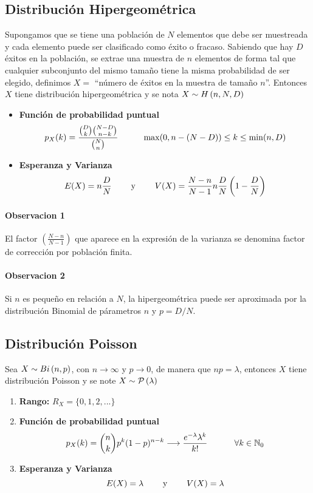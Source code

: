 \subsection{Distribución Hipergeométrica}
Supongamos que se tiene una población de $N$ elementos que debe ser muestreada y cada elemento puede ser clasificado como éxito o fracaso. Sabiendo que hay $D$ éxitos en la población, se extrae una muestra de $n$ elementos de forma tal que cualquier subconjunto del mismo tamaño tiene la misma probabilidad de ser elegido, definimos $X=$ ``número de éxitos en la muestra de tamaño $n$''. Entonces $X$ tiene distribución hipergeométrica y se nota $X\sim H\left(n,N,D\right)$

\begin{itemize}
\item \textbf{Función de probabilidad puntual}
\begin{align*}
p_X(k) = \frac{\binom{D}{k}\binom{N-D}{n-k}}{\binom{N}{n}} \hspace*{1cm} \max(0,n-(N-D))\leq k \leq \min(n,D)
\end{align*}
\item \textbf{Esperanza y Varianza}
$$E(X) = n\frac{D}{N}  \hspace*{8mm}\text{y}\hspace*{8mm} V(X) = \frac{N-n}{N-1}n\frac{D}{N}\left(1-\frac{D}{N}\right)$$
\end{itemize}

\paragraph{Observacion 1} El factor $\left(\frac{N-n}{N-1}\right)$ que aparece en la expresión de la varianza se denomina factor de corrección por población finita.
\paragraph{Observacion 2} Si $n$ es pequeño en relación a $N$, la hipergeométrica puede ser aproximada por la distribución Binomial de párametros $n$ y $p=D/N$.

\subsection{Distribución Poisson}
Sea $X\sim Bi\left(n,p\right)$, con $n \rightarrow \infty$ y $p\rightarrow 0$, de manera que $np = \lambda$, entonces $X$ tiene distribución Poisson y se note $X\sim \mathcal{P}\left(\lambda\right)$

\begin{enumerate}
\item \textbf{Rango:} $R_X = \{0, 1, 2, ...\}$
\item \textbf{Función de probabilidad puntual}\begin{align*}
p_X(k) = \binom{n}{k}p^k(1-p)^{n-k}\longrightarrow\frac{e^{-\lambda}\lambda^k}{k!}~\hspace*{1cm}\forall k\in\mathbb{N}_0
\end{align*}
\item \textbf{Esperanza y Varianza}
$$E(X) = \lambda  \hspace*{8mm}\text{y}\hspace*{8mm} V(X) = \lambda$$
\end{enumerate} 

